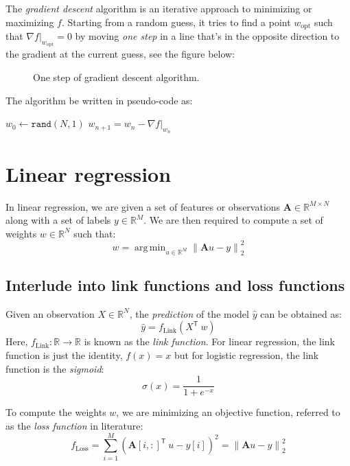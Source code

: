 \documentclass[12pt]{article}
\DeclareMathOperator*{\argmin}{arg\,min} %
\begin{document}
The \textit{gradient descent} algorithm is an iterative approach to
minimizing or maximizing $f$. Starting from a random guess, it tries
to find a point $w_{\text{opt}}$ such that
$\nabla{f}|_{w_{\text{opt}}} = 0$ by moving \textit{one step} in a
line that's in the opposite direction to the gradient at the current
guess, see the figure below:

\begin{figure}[htbp]
  \begin{center}
    
  \end{center}
  \caption{One step of gradient descent algorithm.}
\end{figure}

The algorithm be written in pseudo-code as:

\begin{algorithm}[H]
  $w_0 \longleftarrow \texttt{rand}(N,1)$\;
   {
    $w_{n+1} = w_{n} - \left.\nabla{f}\right|_{w_n}$\;
  }
\end{algorithm}

\section{Linear regression}

In linear regression, we are given a set of features or observations
$\mathbf{A} \in \mathbb{R}^{M\times N}$ along with a set of labels
$y\in \mathbb{R}^M$. We are then required to compute a set of weights
$w\in\mathbb{R}^N$ such that:
\[
w = \argmin_{u \in \mathbb{R}^M} \left\|\mathbf{A} u - y\right\|^2_2
\]

\subsection{Interlude into link functions and loss functions}

Given an observation $X \in \mathbb{R}^N$, the \textit{prediction} of
the model $\hat{y}$ can be obtained as:
\[
\hat{y} = f_{\text{Link}}\left(X^{\mathsf{T}}\ w\right)
\]
Here, $f_{\text{Link}}:\mathbb{R}\to\mathbb{R}$ is known as the
\textit{link function}. For linear regression, the link function is
just the identity, $f(x) = x$ but for logistic regression, the link function is the \textit{sigmoid}:
\[
\sigma(x) = \frac{1}{1 + e^{-x}}
\]

To compute the weights $w$, we are minimizing an objective function, referred to as the \textit{loss function} in literature:
\[
f_{\text{Loss}} = \sum\limits_{i=1}^{M} \left(\mathbf{A}[i,:]^{\mathsf{T}}\ u - y[i]\right)^2 = \left\|\mathbf{A} u - y\right\|^2_2
\]
\end{document}
